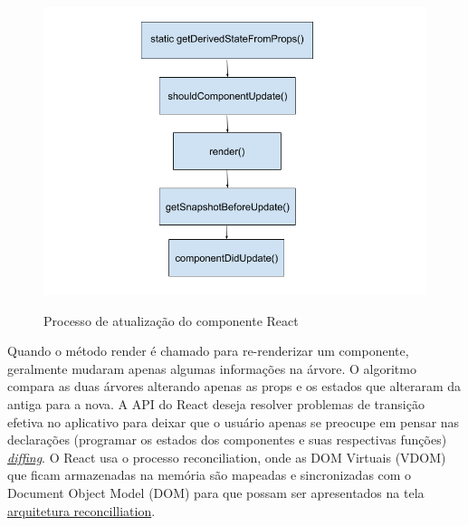 \begin{figure}[H]
\centering
\caption{Processo de atualização do componente React}
\includegraphics[scale=0.4]{figuras/atualizacao.png}
\label{atualizacao}
\end{figure}

Quando o método render é chamado para re-renderizar um componente, geralmente mudaram apenas algumas informações na árvore. O algoritmo compara as duas árvores alterando apenas as props e os estados que alteraram da antiga para a nova. A API do React deseja resolver problemas de transição efetiva no aplicativo para deixar que o usuário apenas se preocupe em pensar nas declarações (programar os estados dos componentes e suas respectivas funções) \href{https://reactjs.org/docs/reconciliation.html}{\textit{diffing}}. O React usa o processo reconciliation, onde as DOM Virtuais (VDOM) que ficam armazenadas na memória são mapeadas e sincronizadas com o Document Object Model (DOM) para que possam ser apresentados na tela \href{https://github.com/acdlite/react-fiber-architecture}{arquitetura reconcilliation}.